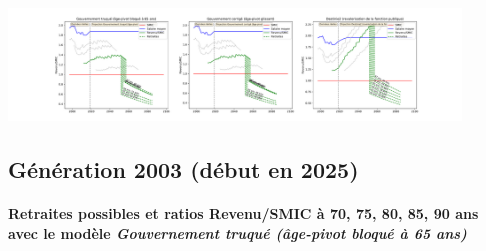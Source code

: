  \begin{center}\includegraphics[width=0.9\textwidth]{fig/Redacteur_1990_22_dest_retraite.pdf}\end{center} \label{fig/Redacteur_1990_22_dest_retraite.pdf} 

\newpage 
 
\subsection{Génération 2003 (début en 2025)} 

\paragraph{Retraites possibles et ratios Revenu/SMIC à 70, 75, 80, 85, 90 ans avec le modèle \emph{Gouvernement truqué (âge-pivot bloqué à 65 ans)}}  
 
